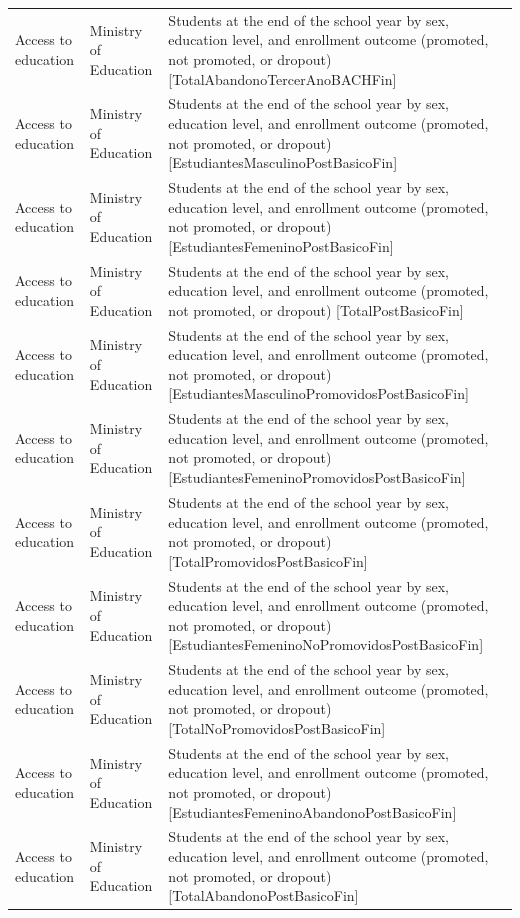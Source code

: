 \documentclass[10pt,a4paper]{article}
\begin{document}
\begin{longtable}{@{}>{\raggedright\arraybackslash}p{3.5cm}>{\raggedright\arraybackslash}p{5.6cm}>{\raggedright\arraybackslash}p{\dimexpr\textwidth-9.1cm-4\tabcolsep\relax}@{}}
Access to education & Ministry of Education & Students at the end of the school year by sex, education level, and enrollment outcome (promoted, not promoted, or dropout) [TotalAbandonoTercerAnoBACHFin]\\
Access to education & Ministry of Education & Students at the end of the school year by sex, education level, and enrollment outcome (promoted, not promoted, or dropout) [EstudiantesMasculinoPostBasicoFin]\\
Access to education & Ministry of Education & Students at the end of the school year by sex, education level, and enrollment outcome (promoted, not promoted, or dropout) [EstudiantesFemeninoPostBasicoFin]\\
Access to education & Ministry of Education & Students at the end of the school year by sex, education level, and enrollment outcome (promoted, not promoted, or dropout) [TotalPostBasicoFin]\\
Access to education & Ministry of Education & Students at the end of the school year by sex, education level, and enrollment outcome (promoted, not promoted, or dropout) [EstudiantesMasculinoPromovidosPostBasicoFin]\\
Access to education & Ministry of Education & Students at the end of the school year by sex, education level, and enrollment outcome (promoted, not promoted, or dropout) [EstudiantesFemeninoPromovidosPostBasicoFin]\\
Access to education & Ministry of Education & Students at the end of the school year by sex, education level, and enrollment outcome (promoted, not promoted, or dropout) [TotalPromovidosPostBasicoFin]\\
Access to education & Ministry of Education & Students at the end of the school year by sex, education level, and enrollment outcome (promoted, not promoted, or dropout) [EstudiantesFemeninoNoPromovidosPostBasicoFin]\\
Access to education & Ministry of Education & Students at the end of the school year by sex, education level, and enrollment outcome (promoted, not promoted, or dropout) [TotalNoPromovidosPostBasicoFin]\\
Access to education & Ministry of Education & Students at the end of the school year by sex, education level, and enrollment outcome (promoted, not promoted, or dropout) [EstudiantesFemeninoAbandonoPostBasicoFin]\\
Access to education & Ministry of Education & Students at the end of the school year by sex, education level, and enrollment outcome (promoted, not promoted, or dropout) [TotalAbandonoPostBasicoFin]\\

\end{longtable}
\end{document}
